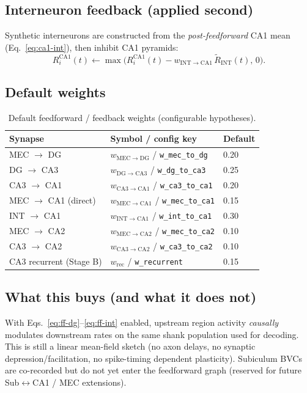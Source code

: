 \documentclass[11pt,a4paper]{article}
\begin{document}
\subsection{Interneuron feedback (applied second)}
Synthetic interneurons are constructed from the \emph{post-feedforward} CA1 mean
(Eq.~\ref{eq:ca1-int}), then inhibit CA1 pyramids:
\begin{equation}
  R_i^{\mathrm{CA1}}(t)
  \leftarrow
  \max\bigl(
    R_i^{\mathrm{CA1}}(t)
    - w_{\mathrm{INT}\to\mathrm{CA1}}\,\tilde R_{\mathrm{INT}}(t),\,
    0
  \bigr).
  \label{eq:ff-int}
\end{equation}

\subsection{Default weights}
\begin{table}[h]
\centering
\caption{Default feedforward / feedback weights (configurable hypotheses).}
\label{tab:ff-weights}
\small
\begin{tabular}{@{}lll@{}}
\toprule
Synapse & Symbol / config key & Default \\
\midrule
MEC $\to$ DG & $w_{\mathrm{MEC}\to\mathrm{DG}}$ / \texttt{w\_mec\_to\_dg} & 0.20 \\
DG $\to$ CA3 & $w_{\mathrm{DG}\to\mathrm{CA3}}$ / \texttt{w\_dg\_to\_ca3} & 0.25 \\
CA3 $\to$ CA1 & $w_{\mathrm{CA3}\to\mathrm{CA1}}$ / \texttt{w\_ca3\_to\_ca1} & 0.20 \\
MEC $\to$ CA1 (direct) & $w_{\mathrm{MEC}\to\mathrm{CA1}}$ / \texttt{w\_mec\_to\_ca1} & 0.15 \\
INT $\to$ CA1 & $w_{\mathrm{INT}\to\mathrm{CA1}}$ / \texttt{w\_int\_to\_ca1} & 0.30 \\
MEC $\to$ CA2 & $w_{\mathrm{MEC}\to\mathrm{CA2}}$ / \texttt{w\_mec\_to\_ca2} & 0.10 \\
CA3 $\to$ CA2 & $w_{\mathrm{CA3}\to\mathrm{CA2}}$ / \texttt{w\_ca3\_to\_ca2} & 0.10 \\
CA3 recurrent (Stage B) & $w_{\mathrm{rec}}$ / \texttt{w\_recurrent} & 0.15 \\
\bottomrule
\end{tabular}
\end{table}

\subsection{What this buys (and what it does not)}
With Eqs.~\ref{eq:ff-dg}--\ref{eq:ff-int} enabled, upstream region activity \emph{causally} modulates downstream rates on the same shank population used for decoding.
This is still a linear mean-field sketch (no axon delays, no synaptic depression/facilitation, no spike-timing dependent plasticity).
Subiculum BVCs are co-recorded but do not yet enter the feedforward graph (reserved for future Sub$\leftrightarrow$CA1 / MEC extensions).
\end{document}
